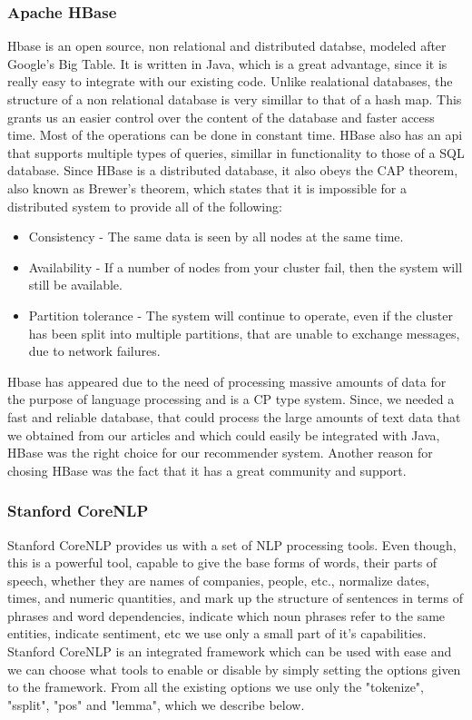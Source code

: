 \subsubsection{Apache HBase}
\label{sec:frameworks-hbase}
Hbase is an open source, non relational and distributed databse, modeled after Google's Big Table. It is written in Java, which is a great advantage, since it is really easy to integrate with our existing code.
Unlike realational databases, the structure of a non relational database is very simillar to that of a hash map. This grants us an easier control over the content of the database and faster access time. Most of the operations can be done in constant time. HBase also has an api that supports multiple types of queries, simillar in functionality to those of a SQL database.
Since HBase is a distributed database, it also obeys the CAP theorem, also known as Brewer's theorem, which states that it is impossible for a distributed system to provide all of the following:

\begin{itemize}
	\item Consistency - The same data is seen by all nodes at the same time.
	\item Availability - If a number of nodes from your cluster fail, then the system will still be available.
	\item Partition tolerance - The system will continue to operate, even if the cluster has been split into multiple partitions, that are unable to exchange messages, due to network failures.
\end{itemize}

Hbase has appeared due to the need of processing massive amounts of data for the purpose of language processing and is a CP type system. 
Since, we needed a fast and reliable database, that could process the large amounts of text data that we obtained from our articles and which could easily be integrated with Java, HBase was the right choice for our recommender system. Another reason for chosing HBase was the fact that it has a great community and support. 

\subsubsection{Stanford CoreNLP}
\label{sec:frameworks-stanford-corenlp}
Stanford CoreNLP\cite{manning-EtAl:2014:P14-5} provides us with a set of NLP processing tools. Even though, this is a powerful tool, capable to give the base forms of words, their parts of speech, whether they are names of companies, people, etc., normalize dates, times, and numeric quantities, and mark up the structure of sentences in terms of phrases and word dependencies, indicate which noun phrases refer to the same entities, indicate sentiment, etc we use only a small part of it's capabilities.
Stanford CoreNLP is an integrated framework which can be used with ease and we can choose what tools to enable or disable by simply setting the options given to the framework. 
From all the existing options we use only the "tokenize", "ssplit", "pos" and "lemma", which we describe below.

